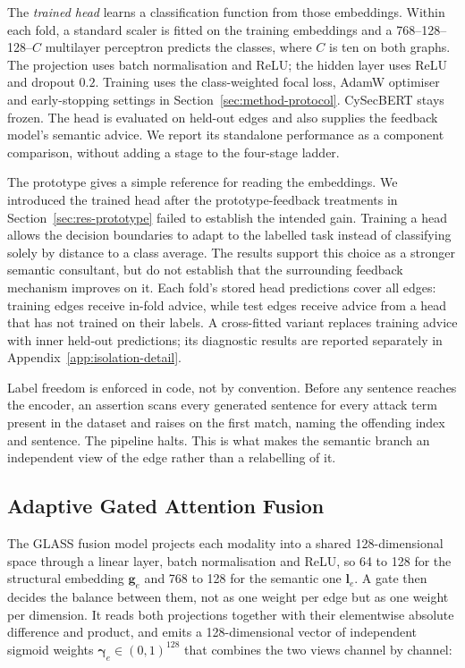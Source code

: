 The \emph{trained head} learns a classification function from those embeddings. Within each fold, a standard scaler is fitted on the training embeddings and a 768--128--128--$C$ multilayer perceptron predicts the classes, where $C$ is ten on both graphs. The projection uses batch normalisation and ReLU; the hidden layer uses ReLU and dropout $0.2$. Training uses the class-weighted focal loss, AdamW optimiser and early-stopping settings in Section~\ref{sec:method-protocol}. CySecBERT stays frozen. The head is evaluated on held-out edges and also supplies the feedback model's semantic advice. We report its standalone performance as a component comparison, without adding a stage to the four-stage ladder.

The prototype gives a simple reference for reading the embeddings. We introduced the trained head after the prototype-feedback treatments in Section~\ref{sec:res-prototype} failed to establish the intended gain. Training a head allows the decision boundaries to adapt to the labelled task instead of classifying solely by distance to a class average. The results support this choice as a stronger semantic consultant, but do not establish that the surrounding feedback mechanism improves on it. Each fold's stored head predictions cover all edges: training edges receive in-fold advice, while test edges receive advice from a head that has not trained on their labels. A cross-fitted variant replaces training advice with inner held-out predictions; its diagnostic results are reported separately in Appendix~\ref{app:isolation-detail}.

Label freedom is enforced in code, not by convention. Before any sentence reaches the encoder,
an assertion scans every generated sentence for every attack term present in the dataset and
raises on the first match, naming the offending index and sentence. The pipeline halts. This
is what makes the semantic branch an independent view of the edge rather than a relabelling
of it.

\subsection{Adaptive Gated Attention Fusion}
\label{sec:method-fusion}

The GLASS fusion model projects each modality into a shared 128-dimensional space through a linear layer, batch
normalisation and ReLU, so 64 to 128 for the structural embedding $\mathbf{g}_{e}$ and 768 to 128
for the semantic one $\mathbf{l}_{e}$. A gate then decides the balance between them, not as one
weight per edge but as one weight per dimension. It reads both projections together with their
elementwise absolute difference and product, and emits a 128-dimensional vector
of independent sigmoid weights $\boldsymbol{\gamma}_{e} \in (0,1)^{128}$ that combines the two
views channel by channel:

